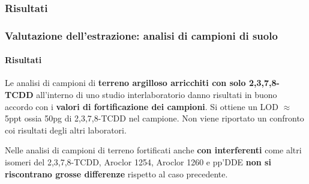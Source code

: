 \subsubsection{Risultati}\begin{frame}\frametitle{Valutazione dell'estrazione: analisi di campioni di suolo}\framesubtitle{Risultati}\pause
Le analisi di campioni di  {\bf terreno argilloso arricchiti con solo 2,3,7,8-TCDD} all'interno di uno studio interlaboratorio danno risultati in buono accordo con i  {\bf valori di fortificazione dei campioni}. Si ottiene un LOD $\approx$ 5ppt ossia 50pg di 2,3,7,8-TCDD nel campione. Non viene riportato un confronto coi risultati degli altri laboratori.

\begin{figure}{}\end{figure}



\end{frame}

\logo{}


\pause

Nelle analisi di campioni di terreno fortificati anche  {\bf con interferenti} come altri isomeri del 2,3,7,8-TCDD, Aroclor 1254, Aroclor 1260 e pp'DDE  {\bf non si riscontrano grosse differenze} rispetto al caso precedente.
\begin{figure}{}\end{figure}


